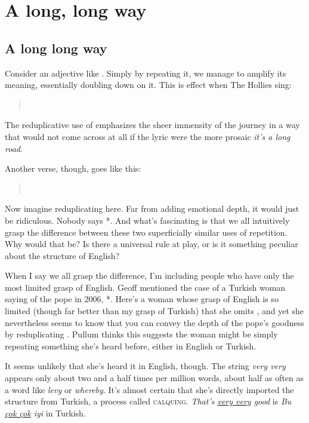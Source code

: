 \chapter{A long, long way}
\newpage
\section{A long long way}
Consider an adjective like . Simply by repeating it, we manage to amplify its meaning, essentially doubling down on it. This is effect when The Hollies sing:

\begin{quote}
\\
\end{quote}

\noindent The reduplicative use of  emphasizes the sheer immensity of the journey in a way that would not come across at all if the lyric were the more prosaic \textit{it's a long road}.

Another verse, though, goes like this:

\begin{quote}
\\
\end{quote}

Now imagine reduplicating  here. Far from adding emotional depth, it would just be ridiculous. Nobody says *. And what's fascinating is that we all intuitively grasp the difference between these two superficially similar uses of repetition. Why would that be? Is there a universal rule at play, or is it something peculiar about the structure of English?

When I say we all grasp the difference, I'm including people who have only the most limited grasp of English. Geoff \citet{pullum2006} mentioned the case of a Turkish woman saying of the pope in 2006, *. Here's a woman whose grasp of English is so limited (though far better than my grasp of Turkish) that she omits , and yet she nevertheless seems to know that you can convey the depth of the pope's goodness by reduplicating . Pullum thinks this suggests the woman might be simply repeating something she's heard before, either in English or Turkish. 

It seems unlikely that she's heard it in English, though. The string \textit{very very} appears only about two and a half times per million words, about half as often as a word like \textit{levy} or \textit{whereby}. It's almost certain that she's directly imported the structure from Turkish, a process called \textsc{calquing}. \textit{That's \uline{very very} good} is \textit{Bu \uline{çok çok} iyi} in Turkish.


